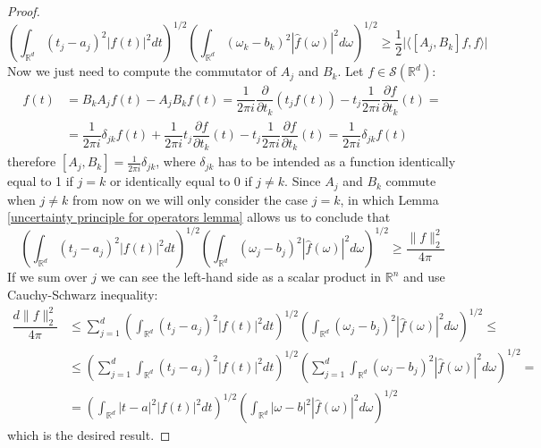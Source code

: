 \documentclass[corpo=11pt, stile=classica, tipotesi=custom,
greek, evenboxes, english]{toptesi}
\numberwithin{equation}{chapter}
\newcommand{\R}{\mathbb{R}} %
\newcommand{\pdfrac}[2]{\dfrac{\partial #1}{\partial #2}}
\begin{document}
\begin{proof}
	\begin{equation*}
		\left(\int_{\R^d}(t_j-a_j)^2 |f(t)|^2 dt\right)^{1/2} \left(\int_{\R^d} (\omega_k-b_k)^2 |\hat{f}(\omega)|^2 d\omega\right)^{1/2} \geq \dfrac12\lvert\langle [A_j,B_k]f,f \rangle \rvert
	\end{equation*}
	Now we just need to compute the commutator of $A_j$ and $B_k$. Let $f \in \mathcal{S}(\R^d)$:
	\begin{align*}
		[A_j,B_k]f(t) &= B_kA_jf(t)-A_jB_kf(t) = \dfrac{1}{2\pi i}\pdfrac{}{t_k}(t_jf(t)) - t_j \dfrac{1}{2\pi i}\pdfrac{f}{t_k}(t) =\\
				  &= \dfrac{1}{2\pi i}\delta_{jk} f(t) + \dfrac{1}{2\pi i} t_j \pdfrac{f}{t_k}(t) - t_j \dfrac{1}{2\pi i}\pdfrac{f}{t_k}(t) = \dfrac{1}{2\pi i}\delta_{jk} f(t)
	\end{align*}
	therefore $[A_j,B_k] = \frac{1}{2\pi i}\delta_{jk}$, where $\delta_{jk}$ has to be intended as a function identically equal to 1 if $j=k$ or identically equal to 0 if $j \neq k$. Since $A_j$ and $B_k$ commute when $j \neq k$ from now on we will only consider the case $j=k$, in which Lemma \ref{uncertainty principle for operators lemma} allows us to conclude that
	\begin{equation}\label{Heisenberg's uncertainty principle formula componentwise}
		\left(\int_{\R^d}(t_j-a_j)^2 |f(t)|^2 dt\right)^{1/2} \left(\int_{\R^d} (\omega_j-b_j)^2 |\hat{f}(\omega)|^2 d\omega\right)^{1/2} \geq \dfrac{\|f\|_2^2}{4\pi}
	\end{equation}
	If we sum over $j$ we can see the left-hand side as a scalar product in $\R^n$ and use Cauchy-Schwarz inequality:
	\begin{align}
		\dfrac{d \|f\|_2^2}{4\pi} &\leq \sum_{j=1}^{d}\left(\int_{\R^d}(t_j-a_j)^2 |f(t)|^2 dt\right)^{1/2} \left(\int_{\R^d} (\omega_j-b_j)^2 |\hat{f}(\omega)|^2 d\omega\right)^{1/2} \leq\label{Heisenberg's uncertainty principle Cauchy Schwarz in Rd}\\
								  &\leq \left(\sum_{j=1}^{d} \int_{\R^d}(t_j-a_j)^2 |f(t)|^2 dt \right)^{1/2} \left(\sum_{j=1}^{d} \int_{\R^d} (\omega_j-b_j)^2 |\hat{f}(\omega)|^2 d\omega \right)^{1/2}=\nonumber\\
								  &= \left(\int_{\R^d}|t-a|^2 |f(t)|^2 dt\right)^{1/2} \left(\int_{\R^d} |\omega-b|^2 |\hat{f}(\omega)|^2 d\omega\right)^{1/2}\nonumber
	\end{align}
	which is the desired result.
	

\end{proof}
\end{document}

